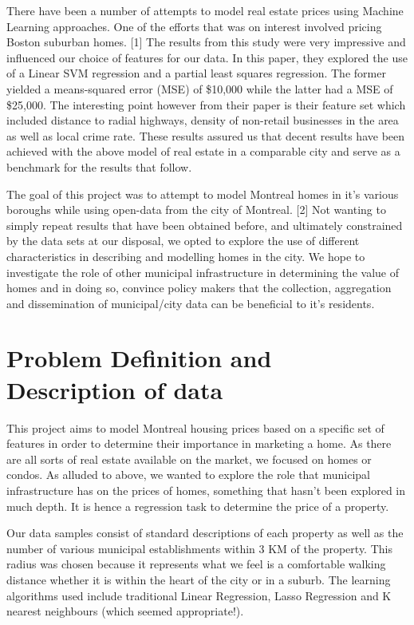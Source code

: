 \documentclass{acm_proc_article-sp}
\begin{document}
	There have been a number of attempts to model real estate prices using Machine Learning approaches. One of the efforts that was on interest involved pricing Boston suburban homes. [1] The results from this study were very impressive and influenced our choice of features for our data. In this paper, they explored the use of a Linear SVM regression and a partial least squares regression. The former yielded a means-squared error (MSE) of \$10,000 while the latter had a MSE of \$25,000. The interesting point however from their paper is their feature set which included distance to radial highways, density of non-retail businesses in the area as well as local crime rate. These results assured us that decent results have been achieved with the above model of real estate in a comparable city and serve as a benchmark for the results that follow. 
	
	The goal of this project was to attempt to model Montreal homes in it's various boroughs while using open-data from the city of Montreal. [2] Not wanting to simply repeat results that have been obtained before, and ultimately constrained by the data sets at our disposal, we opted to explore the use of different characteristics in describing and modelling homes in the city. We hope to investigate the role of other municipal infrastructure in determining the value of homes and in doing so, convince policy makers that the collection, aggregation and dissemination of municipal/city data can be beneficial to it's residents.


\section{Problem Definition and Description of data}
	
	This project aims to model Montreal housing prices based on a specific set of features in order to determine their importance in marketing a home. As there are all sorts of real estate available on the market, we focused on homes or condos. As alluded to above, we wanted to explore the role that municipal infrastructure has on the prices of homes, something that hasn't been explored in much depth. It is hence a regression task to determine the price of a property.
	
	Our data samples consist of standard descriptions of each property as well as the number of various municipal establishments within 3 KM of the property. This radius was chosen because it represents what we feel is a comfortable walking distance whether it is within the heart of the city or in a suburb. The learning algorithms used include traditional Linear Regression, Lasso Regression and K nearest neighbours (which seemed appropriate!). 
\end{document}
